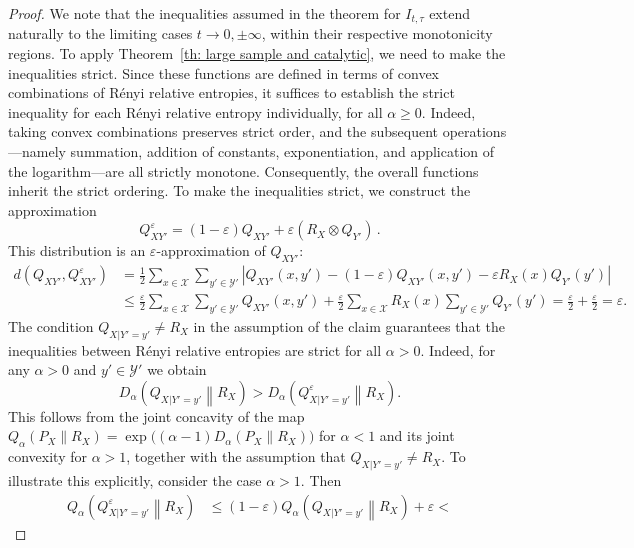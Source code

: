 \documentclass[aps,pra,11pt,onecolumn,nofootinbib,tightenlines]{revtex4-2}
\theoremstyle{definition}
\newcommand{\Y}{\mathcal{Y}}
\newcommand{\mc}[1]{\mathcal{#1}}
\begin{document}
\begin{proof}
We note that the inequalities assumed in the theorem for \(I_{t,\tau}\) extend naturally to the limiting cases \(t\to 0,\pm\infty\), within their respective monotonicity regions.
To apply Theorem~\ref{th: large sample and catalytic}, we need to make the inequalities strict. Since these functions are defined in terms of convex combinations of Rényi relative entropies, it suffices to establish the strict inequality for each Rényi relative entropy individually, for all \(\alpha \ge 0\). Indeed, taking convex combinations preserves strict order, and the subsequent operations—namely summation, addition of constants, exponentiation, and application of the logarithm—are all strictly monotone. Consequently, the overall functions inherit the strict ordering. To make the inequalities strict, we construct the approximation
\begin{equation}
    Q^\varepsilon_{XY'} = \left(1-\varepsilon\right) Q_{XY'} + \varepsilon (R_X \otimes Q_{Y'}) \,.
\end{equation}
This distribution is an $\varepsilon$-approximation of $Q_{XY'}$:
\begin{align}
d(Q_{XY'},Q^\varepsilon_{XY'})&=\frac{1}{2}\sum_{x\in\mc X}\sum_{y'\in\mc Y'}\left|Q_{XY'}(x,y')-(1-\varepsilon)Q_{XY'}(x,y')-\varepsilon R_X(x)Q_{Y'}(y')\right|\\
&\leq\frac{\varepsilon}{2}\sum_{x\in\mc X}\sum_{y'\in\mc Y'}Q_{XY'}(x,y')+\frac{\varepsilon}{2}\sum_{x\in\mc X}R_X(x)\sum_{y'\in\mc Y'}Q_{Y'}(y')=\frac{\varepsilon}{2}+\frac{\varepsilon}{2}=\varepsilon.
\end{align}
The condition $Q_{X|Y'=y'}\neq R_X$ in the assumption of the claim guarantees that the inequalities between R\'{e}nyi relative entropies are strict for all $\alpha>0$. Indeed, for any $\alpha>0$ and $ y'\in \Y'$ we obtain
\begin{equation}
    D_\alpha\!\left(Q_{X|Y'=y'} \middle\| R_X \right)
    >
    D_\alpha\!\left(Q^\varepsilon_{X|Y'=y'} \middle\| R_X \right) .
\end{equation}
This follows from the joint concavity of the map $Q_\alpha(P_X\|R_X) = \exp\!\bigl((\alpha-1)D_\alpha(P_X\|R_X)\bigr)$ for $\alpha<1$ and its joint convexity for $\alpha>1$, together with the assumption that
$Q_{X|Y'=y'}\neq R_X$.
To illustrate this explicitly, consider the case $\alpha>1$. Then
\begin{align}
    Q_\alpha\!\left(Q^\varepsilon_{X|Y'=y'} \middle\| R_X \right)
    &\leq
    \left(1-\varepsilon\right)
    Q_\alpha\!\left(Q_{X|Y'=y'} \middle\| R_X \right)
    + \varepsilon <

\end{align}
\end{proof}
\end{document}
